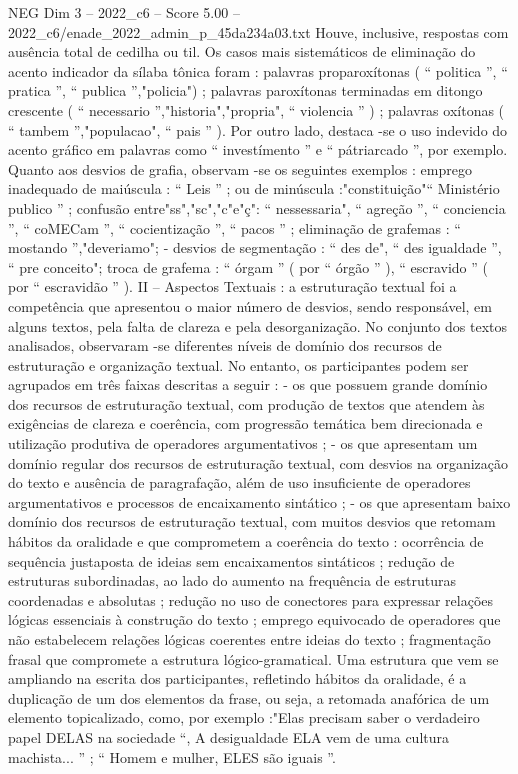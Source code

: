 \begin{textsample}{NEG Dim 3 – 2022\_c6 – Score 5.00 – 2022\_c6/enade\_2022\_admin\_p\_45da234a03.txt}
Houve, inclusive, respostas com ausência total de cedilha ou til.
Os casos mais sistemáticos de eliminação do acento indicador da sílaba tônica foram : palavras proparoxítonas ( “ politica ”, “ pratica ”, “ publica ”,"policia") ; palavras paroxítonas terminadas em ditongo crescente ( “ necessario ”,"historia","propria", “ violencia ” ) ; palavras oxítonas ( “ tambem ”,"populacao", “ pais ” ).
Por outro lado, destaca -se o uso indevido do acento gráfico em palavras como “ investímento ” e “ pátriarcado ”, por exemplo.
Quanto aos desvios de grafia, observam -se os seguintes exemplos : emprego inadequado de maiúscula : “ Leis ” ; ou de minúscula :"constituição"“ Ministério publico ” ; confusão entre"ss","sc","c"e"ç": “ nessessaria", “ agreção ”, “ conciencia ”, “ coMECam ”, “ cocientização ”, “ pacos ” ; eliminação de grafemas : “ mostando ”,"deveriamo"; - desvios de segmentação : “ des de", “ des igualdade ”, “ pre conceito"; troca de grafema : “ órgam ” ( por “ órgão ” ), “ escravido ” ( por “ escravidão ” ).
II – Aspectos Textuais : a estruturação textual foi a competência que apresentou o maior número de desvios, sendo responsável, em alguns textos, pela falta de clareza e pela desorganização.
No conjunto dos textos analisados, observaram -se diferentes níveis de domínio dos recursos de estruturação e organização textual.
No entanto, os participantes podem ser agrupados em três faixas descritas a seguir : - os que possuem grande domínio dos recursos de estruturação textual, com produção de textos que atendem às exigências de clareza e coerência, com progressão temática bem direcionada e utilização produtiva de operadores argumentativos ; - os que apresentam um domínio regular dos recursos de estruturação textual, com desvios na organização do texto e ausência de paragrafação, além de uso insuficiente de operadores argumentativos e processos de encaixamento sintático ; - os que apresentam baixo domínio dos recursos de estruturação textual, com muitos desvios que retomam hábitos da oralidade e que comprometem a coerência do texto : ocorrência de sequência justaposta de ideias sem encaixamentos sintáticos ; redução de estruturas subordinadas, ao lado do aumento na frequência de estruturas coordenadas e absolutas ; redução no uso de conectores para expressar relações lógicas essenciais à construção do texto ; emprego equivocado de operadores que não estabelecem relações lógicas coerentes entre ideias do texto ; fragmentação frasal que compromete a estrutura lógico-gramatical.
Uma estrutura que vem se ampliando na escrita dos participantes, refletindo hábitos da oralidade, é a duplicação de um dos elementos da frase, ou seja, a retomada anafórica de um elemento topicalizado, como, por exemplo :"Elas precisam saber o verdadeiro papel DELAS na sociedade “, A desigualdade ELA vem de uma cultura machista... ” ; “ Homem e mulher, ELES são iguais ”.

\end{textsample}
